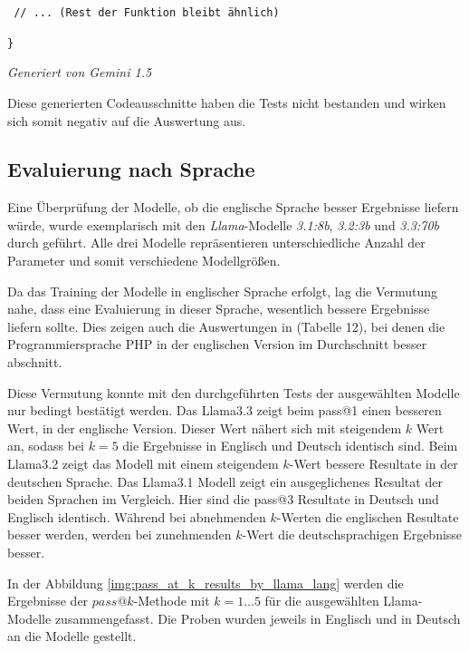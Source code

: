 \texttt{\hspace{0.6cm} // ... (Rest der Funktion bleibt ähnlich)}

\texttt{\}}

\begin{flushright}
	\textit{Generiert von Gemini 1.5}
\end{flushright}

\hrulefill

Diese generierten Codeausschnitte haben die Tests nicht bestanden und wirken sich somit negativ auf die Auswertung aus.\vspace{0.2cm}


\subsection{Evaluierung nach Sprache}
Eine Überprüfung der Modelle, ob die englische Sprache besser Ergebnisse liefern würde, wurde exemplarisch mit den \textit{Llama}-Modelle \textit{3.1:8b}, \textit{3.2:3b} und \textit{3.3:70b} durch geführt. Alle drei Modelle repräsentieren unterschiedliche Anzahl der Parameter und somit verschiedene Modellgrößen.\vspace{0.2cm}

Da das Training der Modelle in englischer Sprache erfolgt, lag die Vermutung nahe, dass eine Evaluierung in dieser Sprache, wesentlich bessere Ergebnisse liefern sollte. Dies zeigen auch die Auswertungen in \cite[][11]{peng-2024} (Tabelle 12), bei denen die Programmiersprache PHP in der englischen Version im Durchschnitt besser abschnitt.\vspace{0.2cm}

Diese Vermutung konnte mit den durchgeführten Tests der ausgewählten Modelle nur bedingt bestätigt werden. Das Llama3.3 zeigt beim pass@1 einen besseren Wert, in der englische Version. Dieser Wert nähert sich mit steigendem $k$ Wert an, sodass bei $k=5$ die Ergebnisse in Englisch und Deutsch identisch sind. Beim Llama3.2 zeigt das Modell mit einem steigendem $k$-Wert bessere Resultate in der deutschen Sprache. Das Llama3.1 Modell zeigt ein ausgeglichenes Resultat der beiden Sprachen im Vergleich. Hier sind die pass@3 Resultate in Deutsch und Englisch identisch. Während bei abnehmenden $k$-Werten die englischen Resultate besser werden, werden bei zunehmenden $k$-Wert die deutschsprachigen Ergebnisse besser.\vspace{0.2cm}

In der Abbildung \ref{img:pass_at_k_results_by_llama_lang} werden die Ergebnisse der $pass@k$-Methode mit $k=1 … 5$ für die ausgewählten Llama-Modelle zusammengefasst. Die Proben wurden jeweils in Englisch und in Deutsch an die Modelle gestellt.\vspace{0.2cm}

